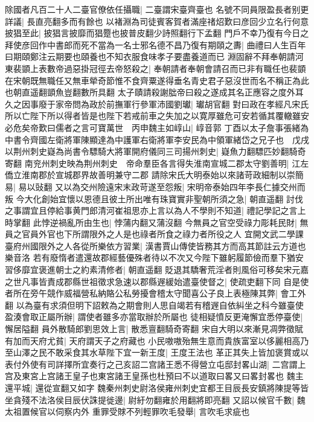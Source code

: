除國者凡百二十人二臺官僚依任攝職|{
	二臺謂宋臺齊臺也}
名號不同員限盈長者别更詳議|{
	長直亮翻多而有餘也}
以褚淵為司徒賓客賀者滿座禇炤歎曰彦回少立名行何意披猖至此|{
	披猖言披靡而猖蹷也披普皮翻少詩照翻行下孟翻}
門戶不幸乃復有今日之拜使彦回作中書郎而死不當為一名士邪名德不昌乃復有期頤之夀|{
	曲禮曰人生百年曰期頤鄭注云期要也頤養也不知衣服食味孝子要盡養道而已}
淵固辭不拜奉朝請河東裴顗上表數帝過惡掛冠徑去帝怒殺之|{
	奉朝請者奉朝會請召而已非有職任也裴顗在宋朝既無職任又無車犖奇節惟不食齊粟遂得垂名青史君子惡沒世而名不稱正為此也朝直遥翻顗魚豈翻數所具翻}
太子賾請殺謝朏帝曰殺之遂成其名正應容之度外耳久之因事廢于家帝問為政於前撫軍行參軍沛國劉瓛|{
	瓛胡官翻}
對曰政在孝經凡宋氏所以亡陛下所以得者皆是也陛下若戒前車之失加之以寛厚雖危可安若循其覆轍雖安必危矣帝歎曰儒者之言可寶萬世　丙申魏主如崞山|{
	崞音郭}
丁酉以太子詹事張緒為中書令齊國左衛將軍陳顯達為中護軍右衛將軍李安民為中領軍緒岱之兄子也　戊戌以荆州刺史嶷為尚書令驃騎大將軍開府儀同三司揚州刺史|{
	嶷魚力翻驃匹妙翻騎奇寄翻}
南兖州刺史映為荆州刺史　帝命羣臣各言得失淮南宣城二郡太守劉善明|{
	江左僑立淮南郡於宣城郡界故善明兼守二郡}
請除宋氏大明泰始以來諸苛政細制以崇簡易|{
	易以䜴翻}
又以為交州險遠宋末政苛遂至怨叛|{
	宋明帝泰始四年李長仁據交州而叛}
今大化創始宜懷以恩德且彼土所出唯有珠寶實非聖朝所須之急|{
	朝直遥翻}
討伐之事謂宜且停給事黄門郎清河崔祖思亦上言以為人不學則不知道|{
	禮記學記之言上時掌翻}
此悖逆禍亂所由生也|{
	悖蒲内翻又蒲沒翻}
今無員之官空受祿力彫耗民財|{
	無員之官員外官也下所謂限外之人是也祿者所食之祿力者所役之人}
宜開文武二學課臺府州國限外之人各從所樂依方習業|{
	漢書賈山傳使皆務其方而高其節註云方道也樂音洛}
若有廢惰者遣還故郡經藝優殊者待以不次又今陛下雖躬履節儉而羣下猶安習侈靡宜褒進朝士之約素清修者|{
	朝直遥翻}
貶退其驕奢荒淫者則風俗可移矣宋元嘉之世凡事皆責成郡縣世祖徵求急速以郡縣遟緩始遣臺使督之|{
	使疏吏翻下同}
自是使者所在旁午競作威福營私納賂公私勞擾會稽太守聞喜公子良上表極陳其弊|{
	會工外翻}
以為臺有求須但明下詔敕為之期會則人思自竭若有稽遟自依糾坐之科今雖臺使盈湊會取正屬所辦|{
	謂使者雖多亦當取辦於所屬也}
徒相疑憤反更淹懈宜悉停臺使|{
	懈居隘翻}
員外散騎郎劉思效上言|{
	散悉亶翻騎奇寄翻}
宋自大明以來漸見凋弊徵賦有加而天府尤貧|{
	天府謂天子之府藏也}
小民嗷嗷殆無生意而貴族富室以侈麗相高乃至山澤之民不敢采食其水草陛下宜一新王度|{
	王度王法也}
革正其失上皆加褒賞或以表付外使有司詳擇所宜奏行之己亥詔二宫諸王悉不得營立屯邸封畧山湖|{
	二宫謂上宫及東宮上宫諸王皇子也東宮諸王皇孫也杜預曰不以道取曰畧又曰畧封畧也}
魏主還平城|{
	還從宣翻又如字}
魏秦州刺史尉洛侯雍州刺史宜都王目辰長安鎮將陳提等皆坐貪殘不法洛侯目辰伏誅提徙邊|{
	尉紆勿翻雍於用翻將即亮翻}
又詔以候官千數|{
	魏太祖置候官以伺察内外}
重罪受賕不列輕罪吹毛發舉|{
	言吹毛求疵也}
